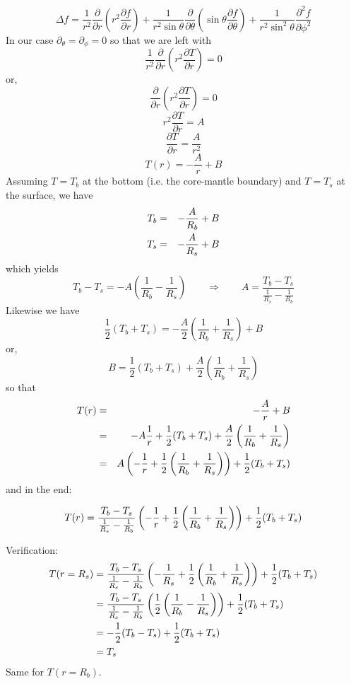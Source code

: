 \begin{equation}
\Delta f=
\frac{1}{r^2}\frac{\partial}{\partial r} \left( r^2 \frac{\partial f}{\partial r} \right)
+\frac{1}{r^2 \sin\theta} \frac{\partial}{\partial \theta} \left( \sin\theta \frac{\partial f}{\partial \theta} \right)
+\frac{1}{r^2 \sin^2\theta}  \frac{\partial^2 f}{\partial \phi^2}
\end{equation}
In our case $\partial_\theta = \partial_\phi=0$ so that we are left with
\[
\frac{1}{r^2}\frac{\partial}{\partial r} \left( r^2 \frac{\partial T}{\partial r} \right) =0
\]
or,
\[
\frac{\partial}{\partial r} \left( r^2 \frac{\partial T}{\partial r} \right) =0
\]
\[
r^2 \frac{\partial T}{\partial r}  = A
\]
\[
\frac{\partial T}{\partial r}  = \frac{A}{r^2}
\]
\[
T(r) = - \frac{A}{r} + B
\]
Assuming $T=T_b$ at the bottom (i.e. the core-mantle boundary) 
and $T=T_s$ at the surface, we have
\begin{eqnarray}
T_b &=& -\frac{A}{R_b} + B \nonumber\\
T_s &=& -\frac{A}{R_s} + B \nonumber
\end{eqnarray}
which yields 
\[
T_b-T_s = -A \left( \frac{1}{R_b} - \frac{1}{R_s}\right)
\qquad \Rightarrow
\qquad
A= \frac{T_b-T_s}{\frac{1}{R_s}-\frac{1}{R_b} } 
\]
Likewise we have
\[
\frac12(T_b+T_s) = - \frac{A}{2} \left( \frac{1}{R_b} +\frac{1}{R_s} \right) + B
\]
or,
\[
B = \frac12(T_b+T_s)  + \frac{A}{2} \left( \frac{1}{R_b} +\frac{1}{R_s} \right) 
\]
so that 
\begin{eqnarray}
T(r) 
&=& -\frac{A}{r} + B  \nonumber\\
&=& - A \frac{1}{r}  +\frac12(T_b+T_s)  + \frac{A}{2} \left( \frac{1}{R_b} +\frac{1}{R_s} \right) \nonumber\\
&=& A \left( -\frac{1}{r} + \frac 12 \left( \frac{1}{R_b} +\frac{1}{R_s} \right) \right)  +\frac12(T_b+T_s) \nonumber
\end{eqnarray}
and in the end:

\begin{mdframed}[backgroundcolor=blue!5]
\begin{equation}
T(r)
=\frac{T_b-T_s}{\frac{1}{R_s}-\frac{1}{R_b} } \left( -\frac{1}{r} + 
\frac 12 \left( \frac{1}{R_b} +\frac{1}{R_s} \right) \right)  +\frac12(T_b+T_s) \nonumber
\end{equation}
\end{mdframed}

\noindent Verification:
\begin{align}
T(r=R_s) 
&=  \frac{T_b-T_s}{\frac{1}{R_s}-\frac{1}{R_b} } \left( -\frac{1}{R_s} + \frac 12 \left( \frac{1}{R_b} +\frac{1}{R_s} \right) \right)  +\frac12(T_b+T_s)  \nonumber\\
&=  \frac{T_b-T_s}{\frac{1}{R_s}-\frac{1}{R_b} } \left( \frac 12 \left( \frac{1}{R_b} -\frac{1}{R_s} \right) \right)  +\frac12(T_b+T_s)  \nonumber\\
&= -\frac12 (T_b-T_s)  +\frac12(T_b+T_s)  \nonumber\\
&= T_s \nonumber
\end{align}
Same for $T(r=R_b)$.

